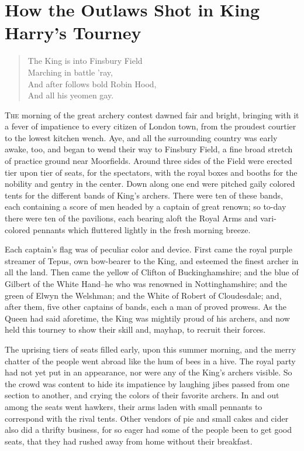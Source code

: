 \chapter{How the Outlaws Shot in King Harry's Tourney}

\begin{quote}
The King is into Finsbury Field\\
Marching in battle 'ray,\\
And after follows bold Robin Hood,\\
And all his yeomen gay.
\end{quote}

\lettrine{T}{he} morning of the great archery contest dawned fair and
bright, bringing with it a fever of impatience to every citizen of London
town, from the proudest courtier to the lowest kitchen wench. Aye, and
all the surrounding country was early awake, too, and began to wend their
way to Finsbury Field, a fine broad stretch of practice ground near
Moorfields. Around three sides of the Field were erected tier upon tier
of seats, for the spectators, with the royal boxes and booths for the
nobility and gentry in the center. Down along one end were pitched gaily
colored tents for the different bands of King's archers. There were ten
of these bands, each containing a score of men headed by a captain of
great renown; so to-day there were ten of the pavilions, each bearing
aloft the Royal Arms and vari-colored pennants which fluttered lightly
in the fresh morning breeze.

Each captain's flag was of peculiar color and device. First came the
royal purple streamer of Tepus, own bow-bearer to the King, and esteemed
the finest archer in all the land. Then came the yellow of Clifton of
Buckinghamshire; and the blue of Gilbert of the White Hand--he who was
renowned in Nottinghamshire; and the green of Elwyn the Welshman; and
the White of Robert of Cloudesdale; and, after them, five other captains
of bands, each a man of proved prowess. As the Queen had said aforetime,
the King was mightily proud of his archers, and now held this tourney to
show their skill and, mayhap, to recruit their forces.

The uprising tiers of seats filled early, upon this summer morning, and
the merry chatter of the people went abroad like the hum of bees in a
hive. The royal party had not yet put in an appearance, nor were any of
the King's archers visible. So the crowd was content to hide its
impatience by laughing jibes passed from one section to another, and
crying the colors of their favorite archers. In and out among the seats
went hawkers, their arms laden with small pennants to correspond with
the rival tents. Other vendors of pie and small cakes and cider also did
a thrifty business, for so eager had some of the people been to get good
seats, that they had rushed away from home without their breakfast.

